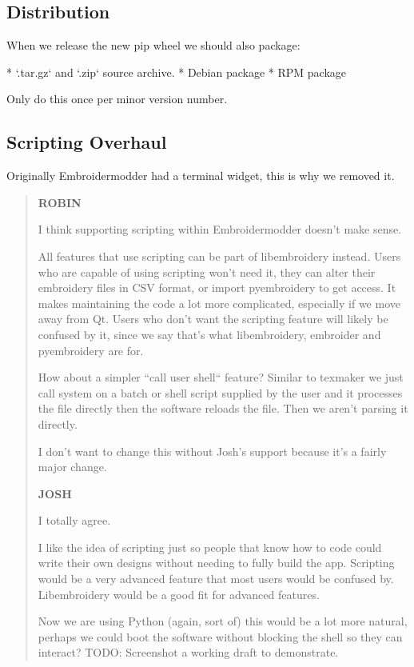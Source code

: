 \subsection{Distribution}

When we release the new pip wheel we should also package:

* `.tar.gz` and `.zip` source archive.
* Debian package
* RPM package

Only do this once per minor version number.

\subsection{Scripting Overhaul}

Originally Embroidermodder had a terminal widget, this is why we removed it.

\begin{quote}
\textbf{ROBIN}

I think supporting scripting within Embroidermodder doesn't make sense.

All features that use scripting can be part of libembroidery instead.
Users who are capable of using scripting won't need it, they can alter their embroidery files in CSV format, or import pyembroidery to get access.
It makes maintaining the code a lot more complicated, especially if we move away from Qt.
Users who don't want the scripting feature will likely be confused by it, since we say that's what libembroidery, embroider and pyembroidery are for.

How about a simpler ``call user shell`` feature? Similar to texmaker we just call system on a batch or shell script supplied by the user and it processes the file directly then the software reloads the file. Then we aren't parsing it directly.

I don't want to change this without Josh's support because it's a fairly major change.

\textbf{JOSH}

I totally agree.

I like the idea of scripting just so people that know how to code could write their own designs without needing to fully build the app. Scripting would be a very advanced feature that most users would be confused by. Libembroidery would be a good fit for advanced features.

Now we are using Python (again, sort of) this would be a lot more natural,
perhaps we could boot the software without blocking the shell so they can
interact? TODO: Screenshot a working draft to demonstrate.
\end{quote}

